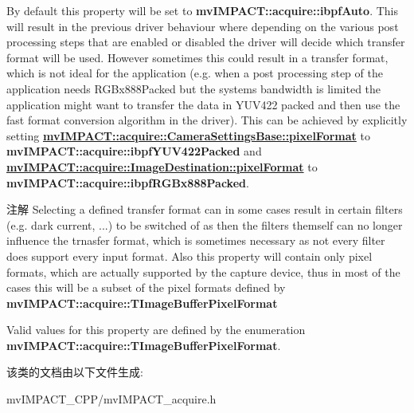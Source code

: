 By default this property will be set to {\bfseries mv\+I\+M\+P\+A\+C\+T\+::acquire\+::ibpf\+Auto}. This will result in the previous driver behaviour where depending on the various post processing steps that are enabled or disabled the driver will decide which transfer format will be used. However sometimes this could result in a transfer format, which is not ideal for the application (e.\+g. when a post processing step of the application needs R\+G\+Bx888\+Packed but the systems bandwidth is limited the application might want to transfer the data in Y\+U\+V422 packed and then use the fast format conversion algorithm in the driver). This can be achieved by explicitly setting {\bfseries \hyperlink{classmv_i_m_p_a_c_t_1_1acquire_1_1_camera_settings_base_af295aa670e45c6cbdb6e5d8517922371}{mv\+I\+M\+P\+A\+C\+T\+::acquire\+::\+Camera\+Settings\+Base\+::pixel\+Format}} to {\bfseries mv\+I\+M\+P\+A\+C\+T\+::acquire\+::ibpf\+Y\+U\+V422\+Packed} and {\bfseries \hyperlink{classmv_i_m_p_a_c_t_1_1acquire_1_1_image_destination_abfd0d30346d66251d5941a5e57efb784}{mv\+I\+M\+P\+A\+C\+T\+::acquire\+::\+Image\+Destination\+::pixel\+Format}} to {\bfseries mv\+I\+M\+P\+A\+C\+T\+::acquire\+::ibpf\+R\+G\+Bx888\+Packed}.

\begin{DoxyNote}{注解}
Selecting a defined transfer format can in some cases result in certain filters (e.\+g. dark current, ...) to be switched of as then the filters themself can no longer influence the trnasfer format, which is sometimes necessary as not every filter does support every input format. Also this property will contain only pixel formats, which are actually supported by the capture device, thus in most of the cases this will be a subset of the pixel formats defined by {\bfseries mv\+I\+M\+P\+A\+C\+T\+::acquire\+::\+T\+Image\+Buffer\+Pixel\+Format} 
\end{DoxyNote}
Valid values for this property are defined by the enumeration {\bfseries mv\+I\+M\+P\+A\+C\+T\+::acquire\+::\+T\+Image\+Buffer\+Pixel\+Format}. 

该类的文档由以下文件生成\+:\begin{DoxyCompactItemize}
\item 
mv\+I\+M\+P\+A\+C\+T\+\_\+\+C\+P\+P/mv\+I\+M\+P\+A\+C\+T\+\_\+acquire.\+h\end{DoxyCompactItemize}
